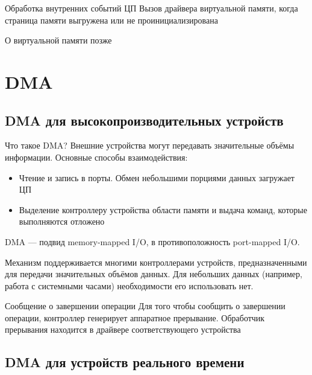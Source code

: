 \documentclass[xetex,aspectratio=43]{beamer}
\begin{document}
\begin{frame}{Обработка внутренних событий ЦП}
	Вызов драйвера виртуальной памяти, когда страница памяти выгружена или
	не проинициализирована

	\pause

	О виртуальной памяти позже
\end{frame}

\section{DMA}

\subsection{DMA для высокопроизводительных устройств}

\begin{frame}{Что такое DMA?}
	Внешние устройства могут передавать значительные объёмы информации.
	Основные способы взаимодействия:

	\begin{itemize}
		\tightlist
		\item
		Чтение и запись в порты. Обмен небольшими порциями данных загружает ЦП
		\item
		Выделение контроллеру устройства области памяти и выдача команд,
		которые выполняются отложено
	\end{itemize}

	\pause


    DMA --- подвид memory-mapped I/O, в противоположность port-mapped I/O.

	Механизм поддерживается многими контроллерами устройств,
	предназначенными для передачи значительных объёмов данных. Для небольших данных (например, работа с системными часами) необходимости его использовать нет.
\end{frame}

\begin{frame}{Сообщение о завершении операции}
	Для того чтобы сообщить о завершении операции, контроллер генерирует
	аппаратное прерывание. Обработчик прерывания находится в драйвере
	соответствующего устройства
\end{frame}

\subsection{DMA для устройств реального времени}
\end{document}
